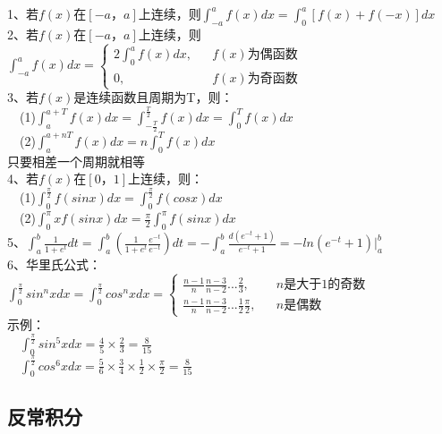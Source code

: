 \documentclass{article}
\begin{document}
\begin{flushleft}
	1、若$f(x)$在$[-a，a]$上连续，则$\int_{-a}^{a}f(x)dx=\int_{0}^{a}[f(x)+f(-x)]dx$\\
	2、若$f(x)$在$[-a，a]$上连续，则$\int_{-a}^{a}f(x)dx=\left\{
	\begin{array}{rcl}
	2\int_{0}^{a}f(x)dx,& & f(x)\mbox{为偶函数}\\
	0,& & f(x)\mbox{为奇函数}
	\end{array} \right.$\\
	3、若$f(x)$是连续函数且周期为T，则：\\
	\ \ (1)$\int_{a}^{a+T}f(x)dx=\int_{-\frac{T}{2}}^{\frac{T}{2}}f(x)dx=\int_{0}^{T}f(x)dx$\\
	\ \ (2)$\int_{a}^{a+nT}f(x)dx=n\int_{0}^{T}f(x)dx$\\
	只要相差一个周期就相等\\
	4、若$f(x)$在$[0，1]$上连续，则：\\
	\ \ (1)$\int_{0}^{\frac{\pi}{2}}f(sinx)dx=\int_{0}^{\frac{\pi}{2}}f(cosx)dx$\\
	\ \ (2)$\int_{0}^{\pi}xf(sinx)dx=\frac{\pi}{2}\int_{0}^{\pi}f(sinx)dx$\\
	5、$\int_{a}^{b}\frac{1}{1+e^t}dt=\int_{a}^{b}(\frac{1}{1+e^t}\frac{e^{-t}}{e^{-t}})dt=-\int_{a}^{b}\frac{d(e^{-t}+1)}{e^{-t}+1}=-ln(e^{-t}+1)|_a^b$\\
	6、华里氏公式：$\int_{0}^{\frac{\pi}{2}}sin^nxdx=\int_{0}^{\frac{\pi}{2}}cos^nxdx=\left\{
	\begin{array}{rcl}
	\frac{n-1}{n}\frac{n-3}{n-2}...\frac{2}{3},& & n\mbox{是大于1的奇数}\\
	\frac{n-1}{n}\frac{n-3}{n-2}...\frac{1}{2}\frac{\pi}{2},& & n\mbox{是偶数}
	\end{array} \right.$\\
	示例：\\
	\ \ $\int_{0}^{\frac{\pi}{2}}sin^5xdx=\frac{4}{5}\times\frac{2}{3}=\frac{8}{15}$\\
	\ \ $\int_{0}^{\frac{\pi}{2}}cos^6xdx=\frac{5}{6}\times\frac{3}{4}\times\frac{1}{2}\times\frac{\pi}{2}=\frac{8}{15}$\\
	
	\subsection{反常积分}
	

\end{flushleft}
\end{document}
